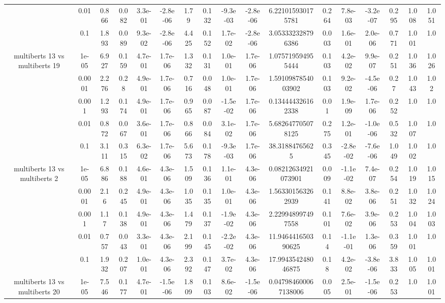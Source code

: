 \begin{tabular}{|c|c|c|c|c|c|c|c|c|c|c|c|c|c|c|c|c|}
 & 0.01 & 0.866 & 0.082 & 3.3e-01 & -2.8e-06 & 1.79 & 0.132 & -9.3e-03 & -2.8e-06 & 6.221015930175781 & 0.264 & 7.8e-03 & -3.2e-07 & 0.295 & 1.008 & 1.051 \\
 & 0.1 & 1.893 & 0.089 & 9.3e-02 & -2.8e-06 & 4.425 & 0.152 & 1.7e-02 & -2.8e-06 & 3.053332328796386 & 0.003 & 1.6e-01 & 2.0e-06 & 0.771 & 1.001 & 1.0 \\
\hline
\multirow{5}{*}{multiberts 13 vs multiberts 19} & 1e-05 & 6.927 & 0.159 & 4.7e-01 & 1.7e-06 & 1.332 & 0.131 & 1.0e-01 & 1.7e-06 & 1.075719594955444 & 0.103 & 4.2e-02 & 9.9e-07 & 0.251 & 1.036 & 1.026 \\
 & 0.0001 & 2.276 & 0.28 & 4.9e-01 & 1.7e-06 & 0.716 & 0.048 & 1.0e-01 & 1.7e-06 & 1.5910987854003902 & 0.103 & 9.2e-02 & -4.5e-06 & 0.27 & 1.043 & 1.02 \\
 & 0.001 & 1.293 & 0.174 & 4.9e-01 & 1.7e-06 & 0.965 & 0.087 & -1.5e-02 & 1.7e-06 & 0.134444326162338 & 0.01 & 1.9e-09 & 1.7e-06 & 0.252 & 1.0 & 1.0 \\
 & 0.01 & 0.872 & 0.067 & 3.6e-01 & 1.7e-06 & 0.866 & 0.084 & 3.1e-02 & 1.7e-06 & 5.682647705078125 & 0.275 & 1.2e-01 & -1.0e-06 & 0.532 & 1.007 & 1.0 \\
 & 0.1 & 3.111 & 0.315 & 6.3e-02 & 1.7e-06 & 5.673 & 0.178 & -9.3e-03 & 1.7e-06 & 38.31884765625 & 0.345 & -2.8e-02 & -7.6e-06 & 1.049 & 1.002 & 1.0 \\
\hline
\multirow{5}{*}{multiberts 13 vs multiberts 2} & 1e-05 & 6.886 & 0.188 & 4.6e-01 & 4.3e-06 & 1.509 & 0.136 & 1.1e-01 & 4.3e-06 & 0.08212634921073901 & 0.009 & -1.1e-02 & 7.4e-07 & 0.254 & 1.019 & 1.015 \\
 & 0.0001 & 2.16 & 0.245 & 4.9e-01 & 4.3e-06 & 1.035 & 0.135 & 1.0e-01 & 4.3e-06 & 1.563301563262939 & 0.141 & 8.8e-02 & 3.8e-06 & 0.251 & 1.032 & 1.024 \\
 & 0.001 & 1.17 & 0.138 & 4.9e-01 & 4.3e-06 & 1.479 & 0.137 & -1.9e-02 & 4.3e-06 & 2.229948997497558 & 0.101 & 7.6e-02 & 3.9e-06 & 0.253 & 1.004 & 1.003 \\
 & 0.01 & 0.757 & 0.043 & 3.3e-01 & 4.3e-06 & 2.199 & 0.145 & -2.2e-02 & 4.3e-06 & 11.946441650390625 & 0.14 & -1.1e-01 & 1.3e-06 & 0.359 & 1.001 & 1.0 \\
 & 0.1 & 1.932 & 0.207 & 1.0e-01 & 4.3e-06 & 2.392 & 0.147 & 3.7e-02 & 4.3e-06 & 17.994354248046875 & 0.18 & 4.2e-02 & -3.8e-06 & 3.833 & 1.005 & 1.001 \\
\hline
\multirow{5}{*}{multiberts 13 vs multiberts 20} & 1e-05 & 7.546 & 0.177 & 4.7e-01 & -1.5e-06 & 1.809 & 0.103 & 8.6e-02 & -1.5e-06 & 0.047984600067138006 & 0.005 & 2.5e-01 & -1.5e-06 & 0.253 & 1.0 & 1.001 \\

\end{tabular}
